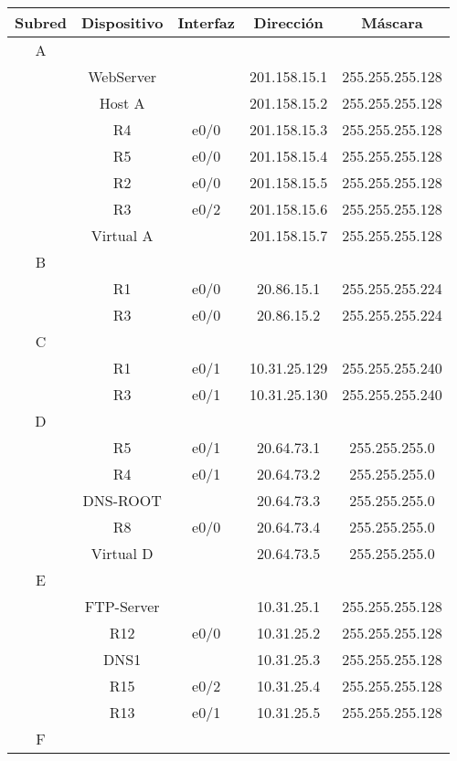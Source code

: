 \documentclass[12pt,a4paper,spanish]{article}
\begin{document}
\begin{tabular}{|c|c|c|c|c|}
	\hline
	Subred & Dispositivo & Interfaz & Dirección & Máscara\\
	\hline
	\hline
	A &  &  &  & \\
	\hline
	  & WebServer & & 201.158.15.1 & 255.255.255.128 \\
	\hline
	  & Host A & & 201.158.15.2 & 255.255.255.128 \\
	\hline
	  & R4 & e0/0 & 201.158.15.3 & 255.255.255.128 \\
	\hline
	  & R5 & e0/0 & 201.158.15.4 & 255.255.255.128 \\
	\hline
	  & R2 & e0/0 & 201.158.15.5 & 255.255.255.128 \\
	\hline
	  & R3 & e0/2 & 201.158.15.6 & 255.255.255.128 \\
	\hline
	  & Virtual A & & 201.158.15.7 & 255.255.255.128 \\
	\hline
	\hline
	B & & & & \\
	\hline
	  & R1 & e0/0 & 20.86.15.1 & 255.255.255.224 \\
	\hline
	  & R3 & e0/0 & 20.86.15.2 & 255.255.255.224 \\
	\hline
	\hline
	C & & & & \\
	\hline
	  & R1 & e0/1 & 10.31.25.129 & 255.255.255.240 \\
	\hline
  	  & R3 & e0/1 & 10.31.25.130 & 255.255.255.240 \\
	\hline
	\hline
	D & & & & \\
	\hline
	  & R5 & e0/1 & 20.64.73.1 & 255.255.255.0 \\
	\hline
	  & R4 & e0/1 & 20.64.73.2 & 255.255.255.0 \\
	\hline
	  & DNS-ROOT & & 20.64.73.3 & 255.255.255.0 \\
	\hline
	  & R8 & e0/0 & 20.64.73.4 & 255.255.255.0 \\
	\hline
	  & Virtual D & & 20.64.73.5 & 255.255.255.0 \\
	\hline
	\hline
	E & & & & \\
	\hline
	  & FTP-Server & & 10.31.25.1 & 255.255.255.128 \\
	\hline
	  & R12 & e0/0 & 10.31.25.2 & 255.255.255.128 \\
	\hline
	  & DNS1 & & 10.31.25.3 & 255.255.255.128 \\
	\hline
	  & R15 & e0/2 & 10.31.25.4 & 255.255.255.128 \\
	\hline
	  & R13 & e0/1 & 10.31.25.5 & 255.255.255.128 \\
	\hline
	\hline
	F & & & & \\

\end{tabular}
\end{document}
